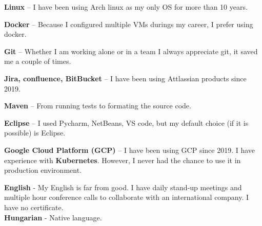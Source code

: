 \documentclass[9pt]{developercv} %
\begin{document}
\begin{minipage}[t]{0.49\textwidth}
    \vspace{-\baselineskip} %


    \textbf{Linux}
    -- I have been using Arch linux as my only OS for more than 10 years.

    \textbf{Docker} 
    -- Because I configured multiple VMs durings my career, I prefer using docker.

    \textbf{Git}
    -- Whether I am working alone or in a team I always appreciate git, it saved me a couple of times.

    \textbf{Jira, confluence, BitBucket}
    -- I have been using Attlassian products since 2019.

    \textbf{Maven}
    -- From running tests to formating the source code.

    \textbf{Eclipse}
    -- I used Pycharm, NetBeans, VS code, but my default choice (if it is possible) is Eclipse.

    \textbf{Google Cloud Platform (GCP)}
    -- I have been using GCP since 2019. I have experience with \textbf{Kubernetes}. However, I never had the chance to use it in production environment.


    \textbf{English}
     - My English is far from good. I have daily stand-up meetings and multiple hour conference calls to collaborate with an international company. I have no certificate.\\
    \textbf{Hungarian}
     - Native language.

\end{minipage}
\hfill
\end{document}
